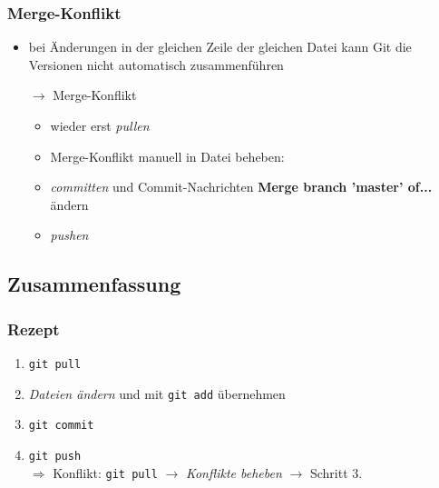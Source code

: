 \documentclass[accentcolor=tud8b,colorbacktitle,inverttitle,landscape,german,presentation,t]{tudbeamer}
\begin{document}
			\begin{frame}
				\frametitle{Merge-Konflikt}
					\begin{itemize}
						\item bei Änderungen in der gleichen Zeile der gleichen Datei kann Git die Versionen nicht automatisch zusammenführen
						\item[$\rightarrow$] Merge-Konflikt
						\begin{itemize}
							\item wieder erst \textit{pullen}
							\item Merge-Konflikt manuell in Datei beheben:\\
							
							\item \textit{committen} und Commit-Nachrichten \textbf{Merge branch 'master' of...} ändern
							\item \textit{pushen}
						\end{itemize}
					\end{itemize}
				
			\end{frame}
			
		
	\subsection{Zusammenfassung}
		\begin{frame}
		\frametitle{Rezept}
			\begin{enumerate}
				\item \texttt{git pull}
				\item \textit{Dateien ändern} und mit \texttt{git add} übernehmen
				\item \texttt{git commit}
				\item \texttt{git push}\\
				$\Rightarrow$ Konflikt: \texttt{git pull} $\rightarrow$ \textit{Konflikte beheben} $\rightarrow$ Schritt 3.
				
			\end{enumerate}
		\end{frame}
	
\end{document}
